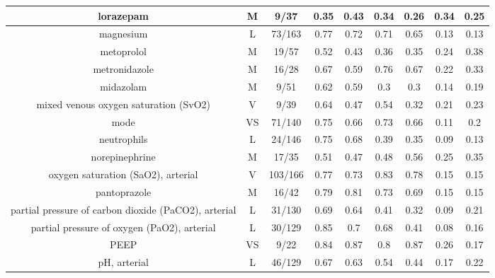 \begin{scriptsize}
\begin{center}
\begin{longtable}{|ccc|c|c|c|c|c|c|}
\midrule
\multicolumn{1}{|c|}{lorazepam} & \multicolumn{1}{c|}{M} & 9/37 & 0.35  & 0.43  & 0.34  & 0.26  & 0.34  & 0.25 \\
\midrule
\multicolumn{1}{|c|}{magnesium} & \multicolumn{1}{c|}{L} & 73/163 & 0.77  & 0.72  & 0.71  & 0.65  & 0.13  & 0.13 \\
\midrule
\multicolumn{1}{|c|}{metoprolol} & \multicolumn{1}{c|}{M} & 19/57 & 0.52  & 0.43  & 0.36  & 0.35  & 0.24  & 0.38 \\
\midrule
\multicolumn{1}{|c|}{metronidazole} & \multicolumn{1}{c|}{M} & 16/28 & 0.67  & 0.59  & 0.76  & 0.67  & 0.22  & 0.33 \\
\midrule
\multicolumn{1}{|c|}{midazolam} & \multicolumn{1}{c|}{M} & 9/51 & 0.62  & 0.59  & 0.3   & 0.3   & 0.14  & 0.19 \\
\midrule
\multicolumn{1}{|c|}{mixed venous oxygen saturation (SvO2)} & \multicolumn{1}{c|}{V} & 9/39 & 0.64  & 0.47  & 0.54  & 0.32  & 0.21  & 0.23 \\
\midrule
\multicolumn{1}{|c|}{mode} & \multicolumn{1}{c|}{VS} & 71/140 & 0.75  & 0.66  & 0.73  & 0.66  & 0.11  & 0.2 \\
\midrule
\multicolumn{1}{|c|}{neutrophils} & \multicolumn{1}{c|}{L} & 24/146 & 0.75  & 0.68  & 0.39  & 0.35  & 0.09  & 0.13 \\
\midrule
\multicolumn{1}{|c|}{norepinephrine} & \multicolumn{1}{c|}{M} & 17/35 & 0.51  & 0.47  & 0.48  & 0.56  & 0.25  & 0.35 \\
\midrule
\multicolumn{1}{|c|}{oxygen saturation (SaO2), arterial} & \multicolumn{1}{c|}{V} & 103/166 & 0.77  & 0.73  & 0.83  & 0.78  & 0.15  & 0.15 \\
\midrule
\multicolumn{1}{|c|}{pantoprazole} & \multicolumn{1}{c|}{M} & 16/42 & 0.79  & 0.81  & 0.73  & 0.69  & 0.15  & 0.15 \\
\midrule
\multicolumn{1}{|c|}{partial pressure of carbon dioxide (PaCO2), arterial} & \multicolumn{1}{c|}{L} & 31/130 & 0.69  & 0.64  & 0.41  & 0.32  & 0.09  & 0.21 \\
\midrule
\multicolumn{1}{|c|}{partial pressure of oxygen (PaO2), arterial} & \multicolumn{1}{c|}{L} & 30/129 & 0.85  & 0.7   & 0.68  & 0.41  & 0.08  & 0.16 \\
\midrule
\multicolumn{1}{|c|}{PEEP} & \multicolumn{1}{c|}{VS} & 9/22 & 0.84  & 0.87  & 0.8   & 0.87  & 0.26  & 0.17 \\
\midrule
\multicolumn{1}{|c|}{pH, arterial} & \multicolumn{1}{c|}{L} & 46/129 & 0.67  & 0.63  & 0.54  & 0.44  & 0.17  & 0.22 \\

\end{longtable}
\end{center}
\end{scriptsize}
